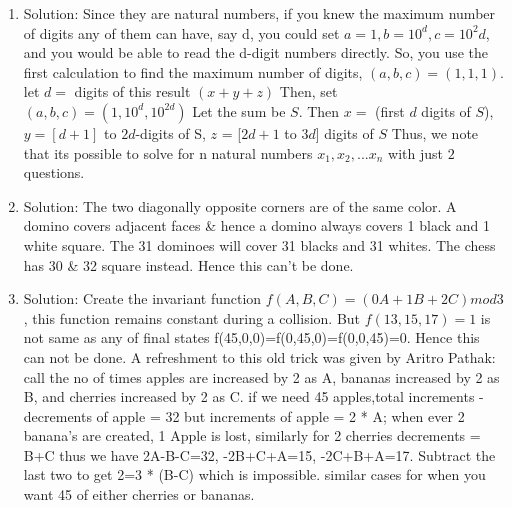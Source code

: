 \begin{enumerate}
\item
Solution: Since they are natural numbers, if you knew the maximum number of digits any of them can have, say d, you could set $a=1, b=10^d, c=10^2d$, and you would be able to read the d-digit numbers directly. So, you use the first calculation to find the maximum number of digits, $(a,b,c)=(1,1,1)$.  let $d =$ digits of this result $(x+y+z)$
Then, set $(a,b,c) = (1, 10^d, 10^{2d})$ Let the sum be $S$.
Then $x =$ (first $d$ digits of $S$), $y = [d+1]$ to $2d$-digits of S, $z$ = [$2d+1$ to $3d$] digits of $S$
Thus, we note that its possible to solve for n natural numbers $x_1,x_2,...x_n$ with just $2$ questions.




\item
Solution: The two diagonally opposite corners are of the same color. A domino covers adjacent faces \& hence a domino always covers 1 black and 1 white square. The 31 dominoes will cover 31 blacks and 31 whites. The chess has 30 \& 32 square instead. Hence this can't be done.




\item
Solution: Create the invariant function $f(A,B,C) = (0A+1B+2C)mod3$, this function remains constant during a collision.
But $f(13,15,17) = 1$ is not same as any of final states f(45,0,0)=f(0,45,0)=f(0,0,45)=0. Hence this can not be done.
A refreshment to this old trick was given by Aritro Pathak:
call the no of times apples are increased by 2 as A, bananas increased by 2 as B, and cherries increased by 2 as C. if we need 45 apples,total increments - decrements of apple = 32
but increments of apple = 2 * A;
when ever 2 banana's are created, 1 Apple is lost, similarly for 2 cherries
decrements = B+C
thus we have 2A-B-C=32, -2B+C+A=15, -2C+B+A=17. Subtract the last two to get 2=3 * (B-C) which is impossible. similar cases for when you want 45 of either cherries or bananas.





\end{enumerate}

